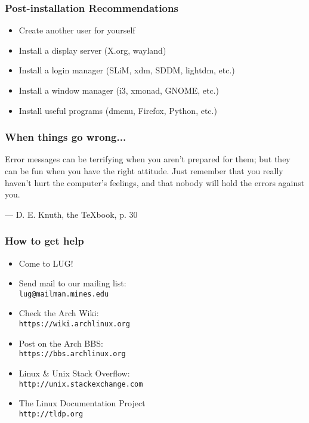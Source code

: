 \documentclass[mathserif]{beamer}
\begin{document}
\begin{frame}
    \frametitle{Post-installation Recommendations}
    \begin{itemize}[<+->]
        \item Create another user for yourself
        \item Install a display server (X.org, wayland)
        \item Install a login manager (SLiM, xdm, SDDM, lightdm, etc.)
        \item Install a window manager (i3, xmonad, GNOME, etc.)
        \item Install useful programs (dmenu, Firefox, Python, etc.)
    \end{itemize}
\end{frame}

\begin{frame}
    \frametitle{When things go wrong...}
    \pause
    Error messages can be terrifying when you aren't prepared for them;
    but they can be fun when you have the right attitude. Just remember that
    you really haven't hurt the computer's feelings, and that nobody will
    hold the errors against you.

    --- D. E. Knuth, the \TeX book, p. 30
\end{frame}

\begin{frame}
    \frametitle{How to get help}
    \begin{itemize}
        \item Come to LUG!
        \item Send mail to our mailing list:\\
            \texttt{lug@mailman.mines.edu}
        \item Check the Arch Wiki:\\
            \texttt{https://wiki.archlinux.org}
        \item Post on the Arch BBS:\\
            \texttt{https://bbs.archlinux.org}
        \item Linux \& Unix Stack Overflow:\\
            \texttt{http://unix.stackexchange.com}
        \item The Linux Documentation Project\\
            \texttt{http://tldp.org}
    \end{itemize}
\end{frame}
\end{document}
